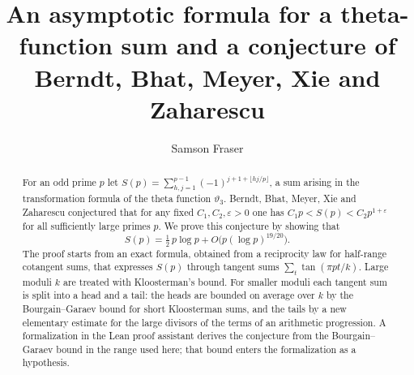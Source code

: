 \documentclass[11pt]{amsart}
\title[A theta-function sum and a conjecture of Berndt et al.]{An asymptotic formula for a theta-function sum and a conjecture of Berndt, Bhat, Meyer, Xie and Zaharescu}
\author{Samson Fraser}
\date{}
\numberwithin{equation}{section}
\theoremstyle{definition}
\theoremstyle{remark}
\begin{document}
\begin{abstract}
For an odd prime $p$ let $S(p)=\sum_{h,j=1}^{p-1}(-1)^{j+1+\lfloor hj/p\rfloor}$, a sum arising in the transformation formula of the theta function $\vartheta_3$. Berndt, Bhat, Meyer, Xie and Zaharescu conjectured that for any fixed $C_1,C_2,\varepsilon>0$ one has $C_1p<S(p)<C_2p^{1+\varepsilon}$ for all sufficiently large primes $p$. We prove this conjecture by showing that
\[
S(p)=\tfrac12\,p\log p+O\bigl(p(\log p)^{19/20}\bigr).
\]
The proof starts from an exact formula, obtained from a reciprocity law for half-range cotangent sums, that expresses $S(p)$ through tangent sums $\sum_t\tan(\pi pt/k)$. Large moduli $k$ are treated with Kloosterman's bound. For smaller moduli each tangent sum is split into a head and a tail: the heads are bounded on average over $k$ by the Bourgain--Garaev bound for short Kloosterman sums, and the tails by a new elementary estimate for the large divisors of the terms of an arithmetic progression. A formalization in the Lean proof assistant derives the conjecture from the Bourgain--Garaev bound in the range used here; that bound enters the formalization as a hypothesis.
\end{abstract}
\maketitle











\appendix

\end{document}
